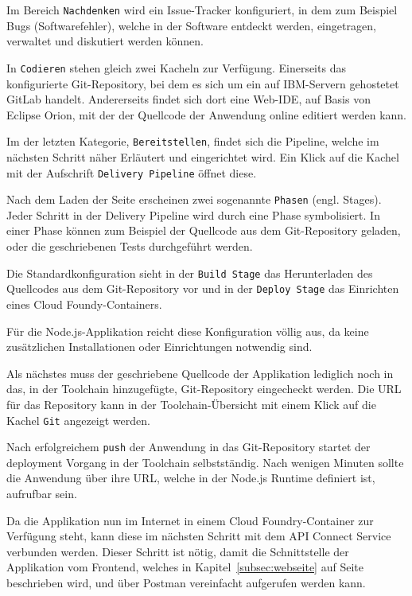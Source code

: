 Im Bereich \texttt{Nachdenken} wird ein Issue-Tracker konfiguriert, in dem zum Beispiel Bugs (Softwarefehler), welche
in der Software entdeckt werden, eingetragen, verwaltet und diskutiert werden können.

In \texttt{Codieren} stehen gleich zwei Kacheln zur Verfügung. Einerseits das konfigurierte Git-Repository, bei dem es
sich um ein auf IBM-Servern gehostetet GitLab handelt. Andererseits findet sich dort eine Web-IDE, auf Basis von Eclipse
Orion, mit der der Quellcode der Anwendung online editiert werden kann.

Im der letzten Kategorie, \texttt{Bereitstellen}, findet sich die Pipeline, welche im nächsten Schritt näher Erläutert
und eingerichtet wird. Ein Klick auf die Kachel mit der Aufschrift \texttt{Delivery Pipeline} öffnet diese.

Nach dem Laden der Seite erscheinen zwei sogenannte \texttt{Phasen} (engl. Stages). Jeder Schritt in der Delivery Pipeline
wird durch eine Phase symbolisiert. In einer Phase können zum Beispiel der Quellcode aus dem Git-Repository geladen, oder
die geschriebenen Tests durchgeführt werden.

Die Standardkonfiguration sieht in der \texttt{Build Stage} das Herunterladen des Quellcodes aus dem Git-Repository vor
und in der \texttt{Deploy Stage} das Einrichten eines Cloud Foundy-Containers.

Für die Node.js-Applikation reicht diese Konfiguration völlig aus, da keine zusätzlichen Installationen oder Einrichtungen
notwendig sind.

Als nächstes muss der geschriebene Quellcode der Applikation lediglich noch in das, in der Toolchain hinzugefügte,
Git-Repository eingecheckt werden. Die URL für das Repository kann in der Toolchain-Übersicht mit einem Klick auf die
Kachel \texttt{Git} angezeigt werden.

Nach erfolgreichem \texttt{push} der Anwendung in das Git-Repository startet der deployment Vorgang in der Toolchain
selbstständig. Nach wenigen Minuten sollte die Anwendung über ihre URL, welche in der Node.js Runtime definiert ist,
aufrufbar sein.

Da die Applikation nun im Internet in einem Cloud Foundry-Container zur Verfügung steht, kann diese im nächsten Schritt
mit dem API Connect Service verbunden werden. Dieser Schritt ist nötig, damit die Schnittstelle der Applikation vom
Frontend, welches in Kapitel~\ref{subsec:webseite} auf Seite~\pageref{subsec:webseite} beschrieben wird, und über Postman
vereinfacht aufgerufen werden kann.

